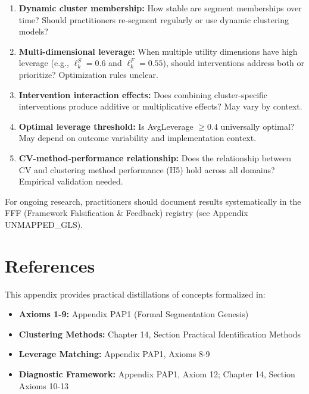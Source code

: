 \begin{enumerate}
\item \textbf{Dynamic cluster membership:} How stable are segment memberships over time? Should practitioners re-segment regularly or use dynamic clustering models?

\item \textbf{Multi-dimensional leverage:} When multiple utility dimensions have high leverage (e.g., $\ell_k^S = 0.6$ and $\ell_k^F = 0.55$), should interventions address both or prioritize? Optimization rules unclear.

\item \textbf{Intervention interaction effects:} Does combining cluster-specific interventions produce additive or multiplicative effects? May vary by context.

\item \textbf{Optimal leverage threshold:} Is AvgLeverage $\geq 0.4$ universally optimal? May depend on outcome variability and implementation context.

\item \textbf{CV-method-performance relationship:} Does the relationship between CV and clustering method performance (H5) hold across all domains? Empirical validation needed.
\end{enumerate}

For ongoing research, practitioners should document results systematically in the FFF (Framework Falsification \& Feedback) registry (see Appendix UNMAPPED_GLS).

\vspace{1em}


\section{References}
\label{sec:h-references}

This appendix provides practical distillations of concepts formalized in:

\begin{itemize}[nosep]
\item \textbf{Axioms 1-9:} Appendix PAP1 (Formal Segmentation Genesis)
\item \textbf{Clustering Methods:} Chapter 14, Section Practical Identification Methods
\item \textbf{Leverage Matching:} Appendix PAP1, Axioms 8-9
\item \textbf{Diagnostic Framework:} Appendix PAP1, Axiom 12; Chapter 14, Section Axioms 10-13
\end{itemize}

